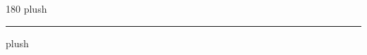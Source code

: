 
\begin{frame}
\begin{center}
\begin{turn}{180}
{\fontsize{2.5cm}{1em}\selectfont plush}
\end{turn}
\vspace{1em}\par  
\hrule
\vspace{1em}\par  
{\fontsize{2.5cm}{1em}\selectfont plush}
\end{center}
\end{frame}
